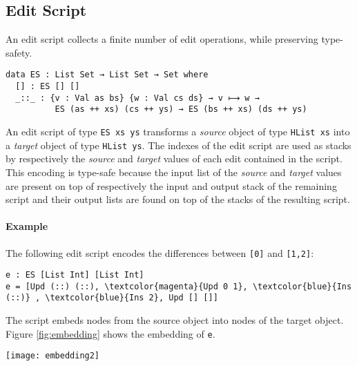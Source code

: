 \documentclass{sigplanconf}
\theoremstyle{plain}
\begin{document}
	\subsection{Edit Script}
        \label{subsec:edit-script}
	An edit script collects a finite number of edit operations, 
	while preserving type-safety. 
\begin{verbatim}
data ES : List Set → List Set → Set where
  [] : ES [] []
  _::_ : {v : Val as bs} {w : Val cs ds} → v ⟼ w → 
          ES (as ++ xs) (cs ++ ys) → ES (bs ++ xs) (ds ++ ys)
\end{verbatim}	
	An edit script of type \texttt{ES xs ys} transforms
	a \emph{source} object of type \texttt{HList xs} into
	a \emph{target} object of type \texttt{HList ys}. 
        The indexes of the edit script are used as stacks by respectively the 
        \emph{source} and \emph{target} values of each edit contained in the script.
        This encoding is type-safe because the input list of the \emph{source} and 
        \emph{target} values are present on top of respectively the input and output 
        stack of the remaining script and their output lists are 
        found on top of the stacks of the resulting script.

        \paragraph{Example}

        The following edit script encodes the differences between \texttt{[0]} 
        and \texttt{[1,2]}: 

\begin{Verbatim}[commandchars=\\\{\}]
e : ES [List Int] [List Int]
e = [Upd (::) (::), \textcolor{magenta}{Upd 0 1}, \textcolor{blue}{Ins (::)} , \textcolor{blue}{Ins 2}, Upd [] []]
\end{Verbatim}

The script embeds nodes from the source object into nodes of the target object.
Figure \ref{fig:embedding} shows the embedding of \texttt{e}.

\begin{figure*}[!t]
\centering
\texttt{[image: embedding2]}
\caption{The embedding induced by \texttt{[Upd (::) (::), \textcolor{magenta}{Upd 0 1}, \textcolor{blue}{Ins (::)} , \textcolor{blue}{Ins 2}, Upd [] []]}}
\label{fig:embedding}
\end{figure*}
\end{document}
